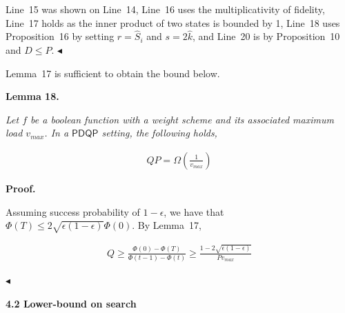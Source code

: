 \documentclass[10pt,a4paper]{article}
\begin{document}
Line 15 was shown on Line 14, Line 16 uses the multiplicativity of fidelity, Line 17 holds as the inner product of two states is bounded by 1, Line 18 uses Proposition 16 by setting $r=\hat{S}_{i}$ and $s=2\hat{k}$, and Line 20 is by Proposition 10 and $D\leq P$.
$\blacktriangleleft$\par




Lemma 17 is sufficient to obtain the bound below.\par






\par\medskip\noindent\textbf{
\textbf{Lemma 18}\textbf{.}
}\par



\emph{Let $f$ be a boolean function with a weight scheme and its associated maximum load $v_{max}$. In a $\mathsf{PDQP}$ setting, the following holds,}\par


\[\begin{gathered}
\displaystyle QP=\Omega\left(\frac{1}{v_{max}}\right)
\end{gathered}\]








\par\medskip\noindent\textbf{Proof.}\par




Assuming success probability of $1-\epsilon$, we have that $\Phi(T)\leq 2\sqrt{\epsilon(1-\epsilon)}\Phi(0)$. By Lemma 17,\par


\[\begin{gathered}
\displaystyle Q\geq\frac{\Phi(0)-\Phi(T)}{\Phi(t-1)-\Phi(t)}\geq\frac{1-2\sqrt{\epsilon(1-\epsilon)}}{Pv_{max}}
\end{gathered}\]


$\blacktriangleleft$\par






\par\medskip\noindent\textbf{
4.2 Lower-bound on search}\par
\end{document}
